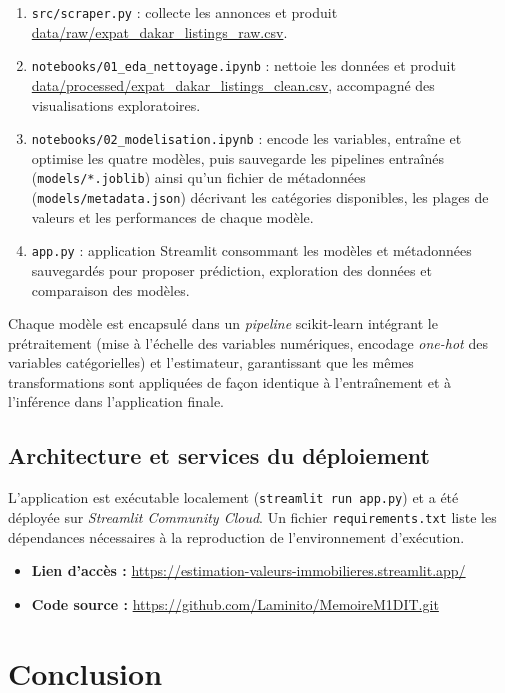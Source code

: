 \begin{enumerate}
  \item \texttt{src/scraper.py} : collecte les annonces et produit\\
  \url{data/raw/expat_dakar_listings_raw.csv}.
  \item \texttt{notebooks/01\_eda\_nettoyage.ipynb} : nettoie les données et produit\\
  \url{data/processed/expat_dakar_listings_clean.csv}, accompagné des visualisations
  exploratoires.
  \item \texttt{notebooks/02\_modelisation.ipynb} : encode les variables, entraîne et optimise
  les quatre modèles, puis sauvegarde les pipelines entraînés (\texttt{models/*.joblib}) ainsi
  qu'un fichier de métadonnées (\texttt{models/metadata.json}) décrivant les catégories
  disponibles, les plages de valeurs et les performances de chaque modèle.
  \item \texttt{app.py} : application Streamlit consommant les modèles et métadonnées
  sauvegardés pour proposer prédiction, exploration des données et comparaison des modèles.
\end{enumerate}

Chaque modèle est encapsulé dans un \emph{pipeline} scikit-learn intégrant le prétraitement
(mise à l'échelle des variables numériques, encodage \emph{one-hot} des variables
catégorielles) et l'estimateur, garantissant que les mêmes transformations sont appliquées de
façon identique à l'entraînement et à l'inférence dans l'application finale.

\subsection{Architecture et services du déploiement}

L'application est exécutable localement (\texttt{streamlit run app.py}) et a été déployée sur
\emph{Streamlit Community Cloud}. Un fichier \texttt{requirements.txt} liste les dépendances
nécessaires à la reproduction de l'environnement d'exécution.

\begin{itemize}
  \item \textbf{Lien d'accès :} \url{https://estimation-valeurs-immobilieres.streamlit.app/}
  \item \textbf{Code source :} \url{https://github.com/Laminito/MemoireM1DIT.git}
\end{itemize}

\section{Conclusion}

